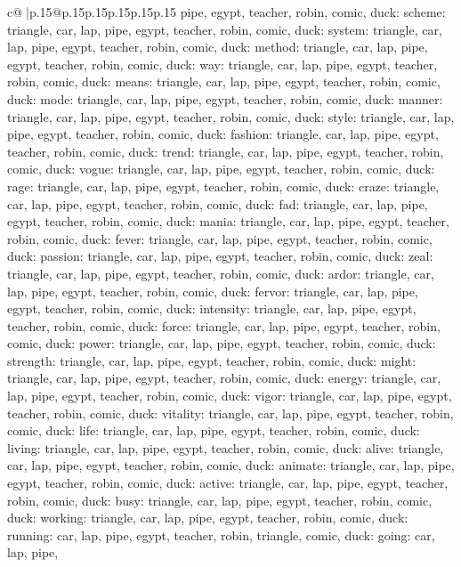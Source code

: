 \documentclass{article}
\begin{document}
{\begin{supertabular}{c@{$\;$}|p{.15\linewidth}@{}p{.15\linewidth}p{.15\linewidth}p{.15\linewidth}p{.15\linewidth}p{.15\linewidth}}
{{{pipe, egypt, teacher, robin, comic, duck\n\nCLUE: scheme\nTARGETS: triangle, car, lap, pipe, egypt, teacher, robin, comic, duck\n\nCLUE: system\nTARGETS: triangle, car, lap, pipe, egypt, teacher, robin, comic, duck\n\nCLUE: method\nTARGETS: triangle, car, lap, pipe, egypt, teacher, robin, comic, duck\n\nCLUE: way\nTARGETS: triangle, car, lap, pipe, egypt, teacher, robin, comic, duck\n\nCLUE: means\nTARGETS: triangle, car, lap, pipe, egypt, teacher, robin, comic, duck\n\nCLUE: mode\nTARGETS: triangle, car, lap, pipe, egypt, teacher, robin, comic, duck\n\nCLUE: manner\nTARGETS: triangle, car, lap, pipe, egypt, teacher, robin, comic, duck\n\nCLUE: style\nTARGETS: triangle, car, lap, pipe, egypt, teacher, robin, comic, duck\n\nCLUE: fashion\nTARGETS: triangle, car, lap, pipe, egypt, teacher, robin, comic, duck\n\nCLUE: trend\nTARGETS: triangle, car, lap, pipe, egypt, teacher, robin, comic, duck\n\nCLUE: vogue\nTARGETS: triangle, car, lap, pipe, egypt, teacher, robin, comic, duck\n\nCLUE: rage\nTARGETS: triangle, car, lap, pipe, egypt, teacher, robin, comic, duck\n\nCLUE: craze\nTARGETS: triangle, car, lap, pipe, egypt, teacher, robin, comic, duck\n\nCLUE: fad\nTARGETS: triangle, car, lap, pipe, egypt, teacher, robin, comic, duck\n\nCLUE: mania\nTARGETS: triangle, car, lap, pipe, egypt, teacher, robin, comic, duck\n\nCLUE: fever\nTARGETS: triangle, car, lap, pipe, egypt, teacher, robin, comic, duck\n\nCLUE: passion\nTARGETS: triangle, car, lap, pipe, egypt, teacher, robin, comic, duck\n\nCLUE: zeal\nTARGETS: triangle, car, lap, pipe, egypt, teacher, robin, comic, duck\n\nCLUE: ardor\nTARGETS: triangle, car, lap, pipe, egypt, teacher, robin, comic, duck\n\nCLUE: fervor\nTARGETS: triangle, car, lap, pipe, egypt, teacher, robin, comic, duck\n\nCLUE: intensity\nTARGETS: triangle, car, lap, pipe, egypt, teacher, robin, comic, duck\n\nCLUE: force\nTARGETS: triangle, car, lap, pipe, egypt, teacher, robin, comic, duck\n\nCLUE: power\nTARGETS: triangle, car, lap, pipe, egypt, teacher, robin, comic, duck\n\nCLUE: strength\nTARGETS: triangle, car, lap, pipe, egypt, teacher, robin, comic, duck\n\nCLUE: might\nTARGETS: triangle, car, lap, pipe, egypt, teacher, robin, comic, duck\n\nCLUE: energy\nTARGETS: triangle, car, lap, pipe, egypt, teacher, robin, comic, duck\n\nCLUE: vigor\nTARGETS: triangle, car, lap, pipe, egypt, teacher, robin, comic, duck\n\nCLUE: vitality\nTARGETS: triangle, car, lap, pipe, egypt, teacher, robin, comic, duck\n\nCLUE: life\nTARGETS: triangle, car, lap, pipe, egypt, teacher, robin, comic, duck\n\nCLUE: living\nTARGETS: triangle, car, lap, pipe, egypt, teacher, robin, comic, duck\n\nCLUE: alive\nTARGETS: triangle, car, lap, pipe, egypt, teacher, robin, comic, duck\n\nCLUE: animate\nTARGETS: triangle, car, lap, pipe, egypt, teacher, robin, comic, duck\n\nCLUE: active\nTARGETS: triangle, car, lap, pipe, egypt, teacher, robin, comic, duck\n\nCLUE: busy\nTARGETS: triangle, car, lap, pipe, egypt, teacher, robin, comic, duck\n\nCLUE: working\nTARGETS: triangle, car, lap, pipe, egypt, teacher, robin, comic, duck\n\nCLUE: running\nTARGETS: car, lap, pipe, egypt, teacher, robin, triangle, comic, duck\n\nCLUE: going\nTARGETS: car, lap, pipe, }}}
\end{supertabular}}
\end{document}
